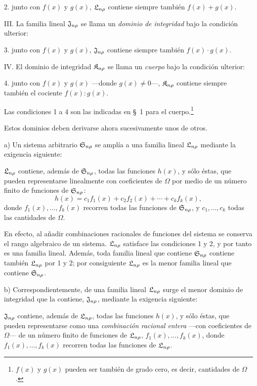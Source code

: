\documentclass[11pt]{article}
\begin{document}
2. junto con $f(x)$ y $g(x)$, $\mathfrak{L}_{n\rho}$ contiene siempre también $f(x)+g(x)$.

III. La familia lineal $\mathfrak{J}_{n\rho}$ se llama un \emph{dominio de integridad} bajo la condición ulterior:

3. junto con $f(x)$ y $g(x)$, $\mathfrak{J}_{n\rho}$ contiene siempre también $f(x)\cdot g(x)$.

IV. El dominio de integridad $\mathfrak{K}_{n\rho}$ se llama un \emph{cuerpo} bajo la condición ulterior:

4. junto con $f(x)$ y $g(x)$ ---donde $g(x)\ne0$---, $\mathfrak{K}_{n\rho}$ contiene siempre también el cociente $f(x):g(x)$.

Las condiciones 1 a 4 son las indicadas en \S\ 1 para el cuerpo.\footnote{$f(x)$ y $g(x)$ pueden ser también de grado cero, es decir, cantidades de $\Omega$.}

Estos dominios deben derivarse ahora sucesivamente unos de otros.

a) Un sistema arbitrario $\mathfrak{S}_{n\rho}$ se amplía a una familia lineal $\mathfrak{L}_{n\rho}$ mediante la exigencia siguiente:

$\mathfrak{L}_{n\rho}$ contiene, además de $\mathfrak{S}_{n\rho}$, todas las funciones $h(x)$, y sólo éstas, que pueden representarse linealmente con coeficientes de $\Omega$ por medio de un número finito de funciones de $\mathfrak{S}_{n\rho}$:
\[
  h(x)=c_1f_1(x)+c_2f_2(x)+\cdots+c_kf_k(x),
\]
donde $f_1(x),\ldots,f_k(x)$ recorren todas las funciones de $\mathfrak{S}_{n\rho}$, y $c_1,
\ldots,c_k$ todas las cantidades de $\Omega$.

En efecto, al añadir combinaciones racionales de funciones del sistema se conserva el rango algebraico de un sistema. $\mathfrak{L}_{n\rho}$ satisface las condiciones 1 y 2, y por tanto es una familia lineal. Además, toda familia lineal que contiene $\mathfrak{S}_{n\rho}$ contiene también $\mathfrak{L}_{n\rho}$ por 1 y 2; por consiguiente $\mathfrak{L}_{n\rho}$ es la menor familia lineal que contiene $\mathfrak{S}_{n\rho}$.

b) Correspondientemente, de una familia lineal $\mathfrak{L}_{n\rho}$ surge el menor dominio de integridad que la contiene, $\mathfrak{J}_{n\rho}$, mediante la exigencia siguiente:

$\mathfrak{J}_{n\rho}$ contiene, además de $\mathfrak{L}_{n\rho}$, todas las funciones $h(x)$, y sólo éstas, que pueden representarse como una \emph{combinación racional entera} ---con coeficientes de $\Omega$--- de un número finito de funciones de $\mathfrak{L}_{n\rho}$, $f_1(x),\ldots,f_k(x)$, donde $f_1(x),\ldots,f_k(x)$ recorren todas las funciones de $\mathfrak{L}_{n\rho}$.
\end{document}
